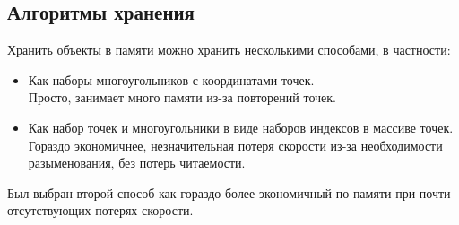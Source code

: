 \documentclass[a4paper,12pt]{report}
\begin{document}
\subsection{Алгоритмы хранения}
Хранить объекты в памяти можно хранить несколькими способами, в частности:
\begin{itemize}
\item Как наборы многоугольников с координатами точек. \\
Просто, занимает много памяти из-за повторений точек.
\item Как набор точек и многоугольники в виде наборов индексов в массиве точек. \\
Гораздо экономичнее, незначительная потеря скорости из-за необходимости разыменования, без потерь читаемости.
\end{itemize}
Был выбран второй способ как гораздо более экономичный по памяти при почти отсутствующих потерях скорости.
\end{document}
